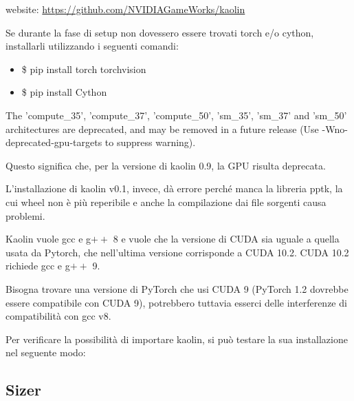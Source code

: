 website: \url{https://github.com/NVIDIAGameWorks/kaolin}

\medskip

Se durante la fase di setup non dovessero essere trovati torch e/o cython, installarli utilizzando i seguenti comandi:

\medskip

\begin{itemize}
\item \$ pip install torch torchvision
\item \$ pip install Cython
\end{itemize}



\medskip



 The 'compute\_35', 'compute\_37', 'compute\_50', 'sm\_35', 
'sm\_37' and 'sm\_50' architectures are deprecated, 
and may be removed in a future release (Use -Wno-deprecated-gpu-targets to suppress warning).



\medskip

Questo significa che, per la versione di kaolin 0.9, la GPU risulta deprecata.

\medskip

L’installazione di kaolin v0.1, invece, dà errore perché manca la libreria pptk, la cui wheel non è più reperibile e anche la compilazione dai file sorgenti causa problemi.

\medskip

Kaolin vuole gcc e g$++$ 8 e vuole che la versione di CUDA sia uguale a quella usata da Pytorch, che nell’ultima versione corrisponde a CUDA 10.2.
CUDA 10.2 richiede  gcc e g$++$ 9.

\medskip

Bisogna trovare una versione di PyTorch che usi CUDA 9 (PyTorch 1.2 dovrebbe essere compatibile con CUDA 9), potrebbero tuttavia esserci delle interferenze di compatibilità con gcc v8.

\medskip

Per verificare la possibilità di importare kaolin, si può testare la sua installazione nel seguente modo:

\medskip






\newpage

\subsection{Sizer}

